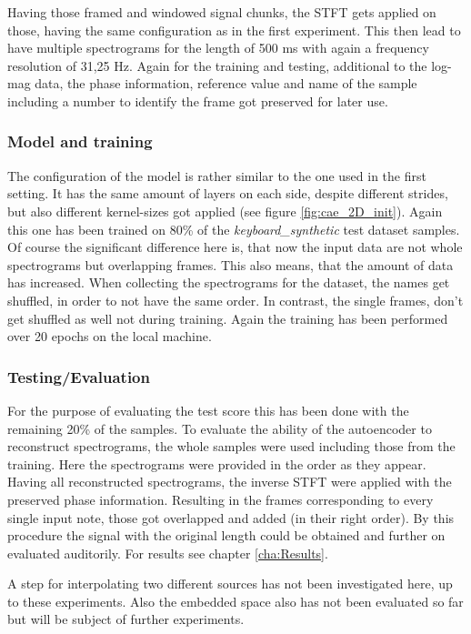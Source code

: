 Having those framed and windowed signal chunks, the STFT gets applied on those, having the same configuration as in the first experiment. This then lead to have multiple spectrograms for the length of 500 ms with again a frequency resolution of 31,25 Hz. Again for the training and testing, additional to the log-mag data, the phase information, reference value and name of the sample including a number to identify the frame got preserved for later use.

\subsubsection{Model and training}
The configuration of the model is rather similar to the one used in the first setting. It has the same amount of layers on each side, despite different strides, but also different kernel-sizes got applied (see figure \ref{fig:cae_2D_init}). Again this one has been trained on 80\% of the \textit{keyboard\_synthetic} test dataset samples. Of course the significant difference here is, that now the input data are not whole spectrograms but overlapping frames. This also means, that the amount of data has increased. When collecting the spectrograms for the dataset, the names get shuffled, in order to not have the same order. In contrast, the single frames, don't get shuffled as well not during training. Again the training has been performed over 20 epochs on the local machine.

\subsubsection{Testing/Evaluation}
For the purpose of evaluating the test score this has been done with the remaining 20\% of the samples. To evaluate the ability of the autoencoder to reconstruct spectrograms, the whole samples were used including those from the training. Here the spectrograms were provided in the order as they appear. Having all reconstructed spectrograms, the inverse STFT were applied with the preserved phase information. Resulting in the frames corresponding to every single input note, those got overlapped and added (in their right order). By this procedure the signal with the original length could be obtained and further on evaluated auditorily. For results see chapter \ref{cha:Results}. 

A step for interpolating two different sources has not been investigated here, up to these experiments. Also the embedded space also has not been evaluated so far but will be subject of further experiments.

